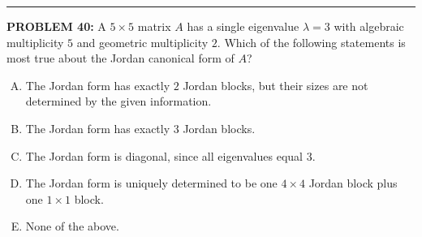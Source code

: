 \documentclass[12pt]{amsart}
\newcommand{\divider}{
  \vspace{-1em} %
  \noindent
  \raisebox{-0.15ex}{\textbullet}%
  \hspace{0.5em}%
  \rule[0.5ex]{0.95\textwidth}{1.0pt}%
  \hspace{0.5em}%
  \raisebox{-0.15ex}{\textbullet}%
  \vspace{0em} %
}
\begin{document}
%
%

\divider

{\bf PROBLEM 40:}
%
A $5 \times 5$ matrix $A$ has a single eigenvalue $\lambda = 3$ with algebraic multiplicity $5$ and geometric multiplicity $2$. Which of the following statements is most true about the Jordan canonical form of $A$?

\begin{enumerate}[(A)]
\item The Jordan form has exactly $2$ Jordan blocks, but their sizes are not determined by the given information.
\item The Jordan form has exactly $3$ Jordan blocks.
\item The Jordan form is diagonal, since all eigenvalues equal $3$.
\item The Jordan form is uniquely determined to be one $4 \times 4$ Jordan block plus one $1 \times 1$ block.
\item None of the above.
\end{enumerate}
\end{document}
